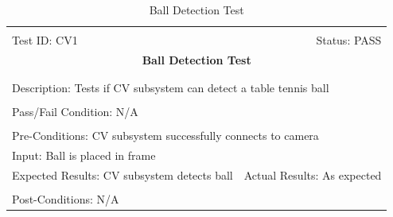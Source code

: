 \documentclass[11pt]{article}
\begin{document}
\begin{center}
\begin{table}[H]
\begin{tabular}{|l r|}\hline&\\[-2mm]
	Test ID: CV1	&Status: PASS\\[-3mm]
	\multicolumn{2}{|c|}{\textbf{\large{Ball Detection Test}}}\\&\\\hline&\\[-3mm]
	\multicolumn{2}{|p{\textwidth}|}{Description: Tests if CV subsystem can detect a table tennis ball}\\[1mm]\hline&\\[-3mm]
	\multicolumn{2}{|p{\textwidth}|}{Pass/Fail Condition: N/A}\\[1mm]\hline&\\[-3mm]
	\multicolumn{2}{|p{\textwidth}|}{Pre-Conditions: CV subsystem successfully connects to camera}\\[4mm]
	\multicolumn{2}{|p{\textwidth}|}{Input: Ball is placed in frame}\\[2mm]\hline
	\multicolumn{1}{|p{0.49\textwidth}}{Expected Results: CV subsystem detects ball}	&\multicolumn{1}{|p{0.45\textwidth}|}{Actual Results: As expected}\\\hline&\\[-3mm]
	\multicolumn{2}{|p{\textwidth}|}{Post-Conditions: N/A}\\\hline
\end{tabular}
\caption{Ball Detection Test}
\end{table}
\end{center}
\end{document}
